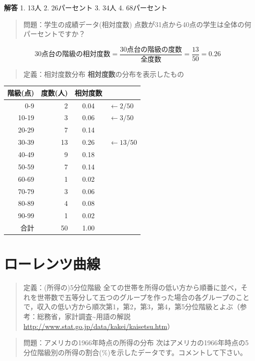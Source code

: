 \documentclass[
]{book}
\theoremstyle{definition}
\theoremstyle{definition}
\theoremstyle{definition}
\theoremstyle{definition}
\theoremstyle{remark}
\begin{document}
\textbf{解答}
1. 13人
2. 26パーセント
3. 34人
4. 68パーセント

\begin{quote}
問題：学生の成績データ(相対度数)
点数が31点から40点の学生は全体の何パーセントですか？
\end{quote}

\[
\text{30点台の階級の相対度数}
=\frac{\text{30点台の階級の度数}}{\text{全度数}}
=\frac{13}{50}=0.26
\]

\begin{quote}
定義：相対度数分布
\textbf{相対度数}の分布を表示したもの
\end{quote}

\begin{longtable}[]{@{}rrcl@{}}
\toprule()
階級(点) & 度数(人) & 相対度数 & \\
\midrule()
\endhead
0-9 & 2 & 0.04 & \(\leftarrow 2/50\) \\
10-19 & 3 & 0.06 & \(\leftarrow 3/50\) \\
20-29 & 7 & 0.14 & \\
30-39 & 13 & 0.26 & \(\leftarrow 13/50\) \\
40-49 & 9 & 0.18 & \\
50-59 & 7 & 0.14 & \\
60-69 & 1 & 0.02 & \\
70-79 & 3 & 0.06 & \\
80-89 & 4 & 0.08 & \\
90-99 & 1 & 0.02 & \\
合計 & 50 & 1.00 & \\
\bottomrule()
\end{longtable}

\hypertarget{ux30edux30fcux30ecux30f3ux30c4ux66f2ux7dda}{%
\chapter{ローレンツ曲線}\label{ux30edux30fcux30ecux30f3ux30c4ux66f2ux7dda}}

\begin{quote}
定義：(所得の)5分位階級
全ての世帯を所得の低い方から順番に並べ，それを世帯数で五等分して五つのグループを作った場合の各グループのことで，収入の低い方から順次第1，第2，第3，第4，第5分位階級とよぶ（参考：総務省，家計調査\textasciitilde 用語の解説 \url{http://www.stat.go.jp/data/kakei/kaisetsu.htm}）
\end{quote}

\begin{quote}
問題：アメリカの1966年時点の所得の分布
次はアメリカの1966年時点の5分位階級別の所得の割合(\%)を示したデータです。コメントして下さい。
\end{quote}
\end{document}
